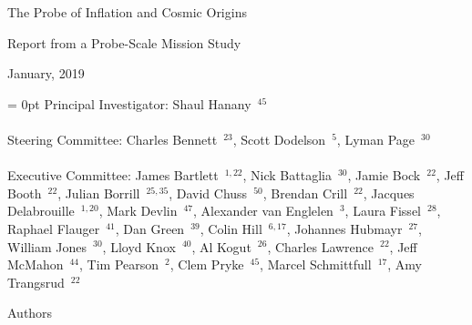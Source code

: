 \documentclass[PICOReport.tex]{subfiles}
\begin{document}

\LARGE{ \centerline{The Probe of Inflation and Cosmic Origins}}
\vspace{0.1in}
\Large{ \centerline{Report from a Probe-Scale Mission Study}}
\Large{ \centerline{January, 2019 }}

\parindent = 0pt
\normalsize{Principal Investigator: Shaul Hanany~$^{45}$ }\\
\vspace{-7pt} \\
\normalsize{Steering Committee: Charles Bennett~$^{23}$, Scott Dodelson~$^{5}$, Lyman Page~$^{30}$ } \\
\vspace{-7pt} \\
\normalsize{Executive Committee: 
James Bartlett~$^{1,22}$,
Nick Battaglia~$^{30}$,
Jamie Bock~$^{22}$, 
Jeff Booth~$^{22}$,
Julian Borrill~$^{25,35}$, 
David Chuss~$^{50}$,
Brendan Crill~$^{22}$, 
Jacques Delabrouille~$^{1,20}$,
Mark Devlin~$^{47}$, 
Alexander van Englelen~$^3$,
Laura Fissel~$^{28}$,
Raphael Flauger~$^{41}$, 
Dan Green~$^{39}$,
Colin Hill~$^{6,17}$,
Johannes Hubmayr~$^{27}$,
William Jones~$^{30}$, 
Lloyd Knox~$^{40}$, 
Al Kogut~$^{26}$, 
Charles Lawrence~$^{22}$, 
Jeff McMahon~$^{44}$, 
Tim Pearson~$^{2}$,
Clem Pryke~$^{45}$, 
Marcel Schmittfull~$^{17}$,
Amy Trangsrud~$^{22}$ 
}
\\


\label{authorlist}

\Large  {\centerline {Authors}}
\end{document}
